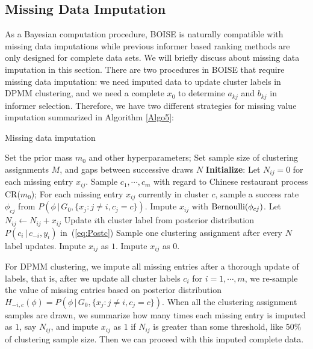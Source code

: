 \documentclass[12pt]{article}
\begin{document}
\subsection{Missing Data Imputation}
As a Bayesian computation procedure, BOISE is naturally compatible with missing data imputations while previous informer based ranking methods are only designed for complete data sets. We will briefly discuss about missing data imputation in this section. 
There are two procedures in BOISE that require missing data imputation: we need imputed data to update cluster labels in DPMM clustering, and we need a complete $x_0$ to determine $a_{kj}$ and $b_{kj}$ in informer selection. Therefore, we have two different strategies for missing value imputation summarized in Algorithm \ref{Algo5}:
\begin{algorithm}
\caption{Missing data imputation}\label{Algo5}
\begin{algorithmic}[1]
\State Set the prior mass $m_0$ and other hyperparameters;
\State Set sample size of clustering assignments $M$, and gaps between successive draws $N$
\State \textbf{Initialize}: Let $N_{ij} = 0$ for each missing entry $x_{ij}$. Sample $c_1,\cdots,c_m$ with regard to Chinese restaurant process CR($m_0$);
    \State For each missing entry $x_{ij}$ currently in cluster $c$, sample a success rate $\phi_{cj}$ from $P\left(\phi\,|\,G_0,\{x_j:j\neq i, c_j = c\} \right)$.
    \State Impute $x_{ij}$ with ${\rm Bernoulli}(\phi_{cj})$. Let $N_{ij} \gets N_{ij}+x_{ij}$
        \State Update $i$th cluster label from posterior distribution $P(c_i\,|\,c_{-i},y_i)$ in~(\ref{eq:Postc})
    \EndFor
\State Sample one clustering assignment after every $N$ label updates.
\EndWhile
{}
    \State Impute $x_{ij}$ as $1$.
\Else
    \State Impute $x_{ij}$ as $0$.
\EndIf
\end{algorithmic}
\end{algorithm} 

 For DPMM clustering, we impute all missing entries after a thorough update of labels, that is, after we update all cluster labels $c_i$ for $i=1,\cdots,m$, we re-sample the value of missing entries based on posterior distribution $H_{-i,c}(\phi) = P\left(\phi\,|\,G_0,\{x_j:j\neq i, c_j = c\} \right)$. When all the clustering assignment samples are drawn, we summarize how many times each missing entry is imputed as $1$, say $N_{ij}$, and impute $x_{ij}$ as $1$ if $N_{ij}$ is greater than some threshold, like $50\%$ of clustering sample size. Then we can proceed with this imputed complete data. 
\end{document}
